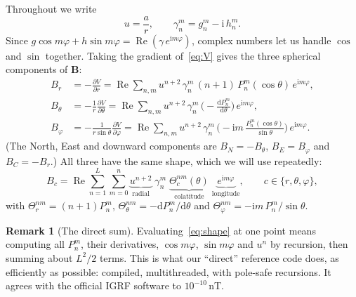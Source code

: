 \documentclass[11pt,a4paper]{article}
\theoremstyle{definition}
\newtheorem{remark}{Remark}
\renewcommand{\Re}{\operatorname{Re}}
\newcommand{\ii}{\mathrm{i}}
\newcommand{\dd}{\mathrm{d}}
\begin{document}
Throughout we write
\begin{equation}
u=\frac ar,\qquad \gamma_n^m=g_n^m-\ii\,h_n^m .
\end{equation}
Since $g\cos m\varphi+h\sin m\varphi=\Re(\gamma\,e^{\ii m\varphi})$, complex numbers let us handle $\cos$ and $\sin$
together. Taking the gradient of~\eqref{eq:V} gives the three spherical components of $\mathbf B$:
\begin{align}
B_r&=-\frac{\partial V}{\partial r}=\Re\sum_{n,m}u^{n+2}\,\gamma_n^m\,(n+1)\,P_n^m(\cos\theta)\,e^{\ii m\varphi},\label{eq:Br}\\
B_\theta&=-\frac1r\frac{\partial V}{\partial\theta}=\Re\sum_{n,m}u^{n+2}\,\gamma_n^m\,\Big(-\frac{\dd P_n^m}{\dd\theta}\Big)\,e^{\ii m\varphi},\label{eq:Bt}\\
B_\varphi&=-\frac{1}{r\sin\theta}\frac{\partial V}{\partial\varphi}=\Re\sum_{n,m}u^{n+2}\,\gamma_n^m\,\Big(-\ii m\,\frac{P_n^m(\cos\theta)}{\sin\theta}\Big)\,e^{\ii m\varphi}.\label{eq:Bp}
\end{align}
(The North, East and downward components are $B_N=-B_\theta$, $B_E=B_\varphi$ and $B_C=-B_r$.) All three have the same
shape, which we will use repeatedly:
\begin{equation}\label{eq:shape}
\boxed{\;B_c=\Re\sum_{n=1}^{L}\sum_{m=0}^{n}\underbrace{u^{n+2}}_{\text{radial}}\;\gamma_n^m\;\underbrace{\Theta_c^{nm}(\theta)}_{\text{colatitude}}\;\underbrace{e^{\ii m\varphi}}_{\text{longitude}},\qquad c\in\{r,\theta,\varphi\},\;}
\end{equation}
with $\Theta_r^{nm}=(n+1)P_n^m$, $\Theta_\theta^{nm}=-\dd P_n^m/\dd\theta$ and $\Theta_\varphi^{nm}=-\ii m\,P_n^m/\sin\theta$.

\begin{remark}[The direct sum]
Evaluating~\eqref{eq:shape} at one point means computing all $P_n^m$, their derivatives, $\cos m\varphi$, $\sin m\varphi$ and $u^n$ by
recursion, then summing about $L^2/2$ terms. This is what our ``direct'' reference code does, as efficiently as possible:
compiled, multithreaded, with pole-safe recursions. It agrees with the official IGRF software to $10^{-10}$\,nT.
\end{remark}
\end{document}
